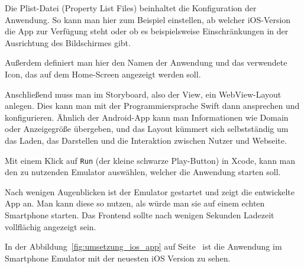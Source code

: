 Die Plist-Datei (Property List Files) beinhaltet die Konfiguration der Anwendung. So kann man hier zum Beispiel
einstellen, ab welcher iOS-Version die App zur Verfügung steht oder ob es beispielsweise Einschränkungen in der
Ausrichtung des Bildschirmes gibt.

Außerdem definiert man hier den Namen der Anwendung und das verwendete Icon, das auf dem Home-Screen angezeigt werden
soll.

Anschließend muss man im Storyboard, also der View, ein WebView-Layout anlegen. Dies kann man mit der Programmiersprache
Swift dann ansprechen und konfigurieren. Ähnlich der Android-App kann man Informationen wie Domain oder Anzeigegröße
übergeben, und das Layout kümmert sich selbstständig um das Laden, das Darstellen und die Interaktion zwischen Nutzer
und Webseite.

Mit einem Klick auf \texttt{Run} (der kleine schwarze Play-Button) in Xcode, kann man den zu nutzenden Emulator
auswählen, welcher die Anwendung starten soll.

Nach wenigen Augenblicken ist der Emulator gestartet und zeigt die entwickelte App an. Man kann diese so nutzen, als
würde man sie auf einem echten Smartphone starten. Das Frontend sollte nach wenigen Sekunden Ladezeit vollflächig
angezeigt sein.

In der Abbildung~\ref{fig:umsetzung_ios_app} auf Seite~\pageref{fig:umsetzung_ios_app} ist die Anwendung im Smartphone
Emulator mit der neuesten iOS Version zu sehen.

